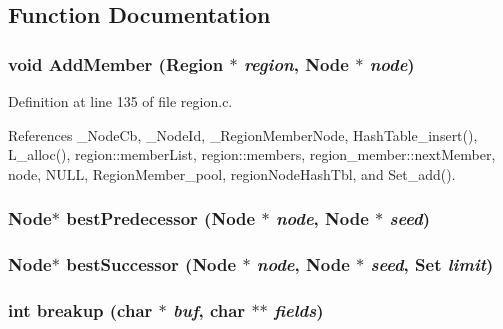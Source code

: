 \subsection{Function Documentation}
\subsubsection{\setlength{\rightskip}{0pt plus 5cm}void Add\-Member (\bf{Region} $\ast$ {\em region}, \bf{Node} $\ast$ {\em node})}\label{region_8h_cddadead93362fe953336a0747798580}




Definition at line 135 of file region.c.

References \_\-Node\-Cb, \_\-Node\-Id, \_\-Region\-Member\-Node, Hash\-Table\_\-insert(), L\_\-alloc(), region::member\-List, region::members, region\_\-member::next\-Member, node, NULL, Region\-Member\_\-pool, region\-Node\-Hash\-Tbl, and Set\_\-add().
\subsubsection{\setlength{\rightskip}{0pt plus 5cm}\bf{Node}$\ast$ best\-Predecessor (\bf{Node} $\ast$ {\em node}, \bf{Node} $\ast$ {\em seed})}\label{region_8h_b54b688e06134e790f6055fb27aa601b}


\subsubsection{\setlength{\rightskip}{0pt plus 5cm}\bf{Node}$\ast$ best\-Successor (\bf{Node} $\ast$ {\em node}, \bf{Node} $\ast$ {\em seed}, \bf{Set} {\em limit})}\label{region_8h_2f098887fede32d139628085f11e04fb}


\subsubsection{\setlength{\rightskip}{0pt plus 5cm}int breakup (char $\ast$ {\em buf}, char $\ast$$\ast$ {\em fields})}\label{region_8h_47b643d716c466f08558c9be68cd8207}



